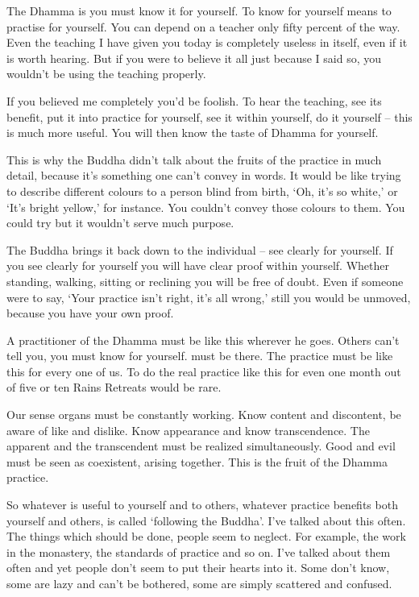 The Dhamma is  you must know it for yourself. To know for yourself means to practise for yourself. You can depend on a teacher only fifty percent of the way. Even the teaching I have given you today is \mbox{completely} useless in itself, even if it is worth hearing. But if you were to believe it all just because I said so, you wouldn't be using the teaching properly.

If you believed me completely you'd be foolish. To hear the teaching, see its benefit, put it into practice for yourself, see it within yourself, do it yourself -- this is much more useful. You will then know the taste of Dhamma for yourself.

This is why the Buddha didn't talk about the fruits of the practice in much detail, because it's something one can't convey in words. It would be like trying to describe different colours to a person blind from birth, `Oh, it's so white,' or `It's bright yellow,' for instance. You couldn't convey those colours to them. You could try but it wouldn't serve much purpose.

The Buddha brings it back down to the individual -- see clearly for yourself. If you see clearly for yourself you will have clear proof within yourself. Whether standing, walking, sitting or reclining you will be free of doubt. Even if someone were to say, `Your practice isn't right, it's all wrong,' still you would be unmoved, because you have your own proof.

A practitioner of the Dhamma must be like this wherever he goes. Others can't tell you, you must know for yourself.  must be there. The practice must be like this for every one of us. To do the real practice like this for even one month out of five or ten Rains Retreats would be rare.

Our sense organs must be constantly working. Know content and discontent, be aware of like and dislike. Know appearance and know transcendence. The apparent and the transcendent must be realized simultaneously. Good and evil must be seen as coexistent, arising together. This is the fruit of the Dhamma practice.

So whatever is useful to yourself and to others, whatever practice benefits both yourself and others, is called `following the Buddha'. I've talked about this often. The things which should be done, people seem to neglect. For example, the work in the monastery, the standards of practice and so on. I've talked about them often and yet people don't seem to put their hearts into it. Some don't know, some are lazy and can't be bothered, some are simply scattered and confused.

